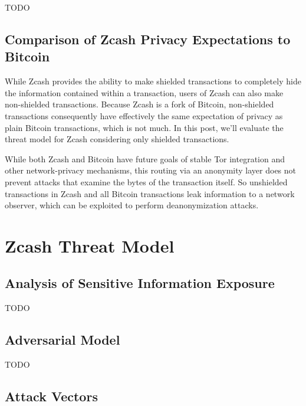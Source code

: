 \documentclass{article}
\begin{document}
TODO

\subsection{Comparison of Zcash Privacy Expectations to Bitcoin}

While Zcash provides the ability to make shielded transactions to completely
hide the information contained within a transaction, users of Zcash can also
make non-shielded transactions. Because Zcash is a fork of Bitcoin,
non-shielded transactions consequently have effectively the same expectation of
privacy as plain Bitcoin transactions, which is not much. In this post, we’ll
evaluate the threat model for Zcash considering only shielded transactions.

While both Zcash and Bitcoin have future goals of
stable Tor integration and other network-privacy mechanisms, this routing via
an anonymity layer does not prevent attacks that examine the bytes of the
transaction itself. So unshielded transactions in Zcash and all Bitcoin
transactions leak information to a network observer, which can be exploited to
perform deanonymization attacks.

\section{Zcash Threat Model}

\subsection{Analysis of Sensitive Information Exposure}
TODO

\subsection{Adversarial Model}
TODO

\subsection{Attack Vectors}



\end{document}
